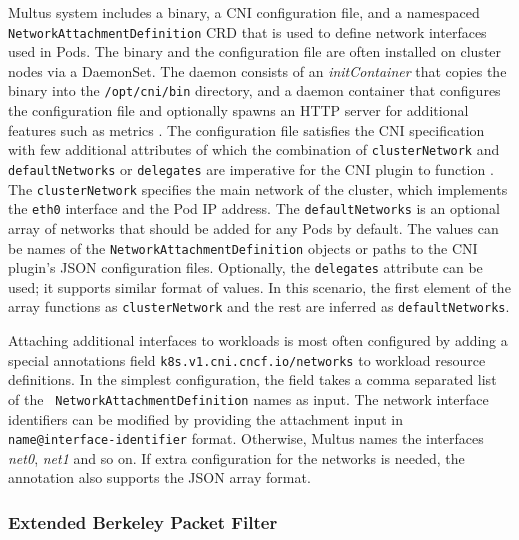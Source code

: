 \documentclass[english, 12pt, a4paper, sci, utf8, a-2b, online]{aaltothesis}
\begin{document}
Multus system includes a binary, a CNI configuration file, and a namespaced \texttt{NetworkAttachmentDefinition} CRD that is used to define network interfaces used in Pods.
The binary and the configuration file are often installed on cluster nodes via a DaemonSet.
The daemon consists of an \emph{initContainer} that copies the binary into the \texttt{/opt/cni/bin} directory, and a daemon container that configures the configuration file and optionally spawns an HTTP server for additional features such as metrics \cite{multus-cni}.
The configuration file satisfies the CNI specification with few additional attributes of which the combination of \texttt{clusterNetwork} and \texttt{defaultNetworks} or \texttt{delegates} are imperative for the CNI plugin to function \cite{multus-cni-config}.
The \texttt{clusterNetwork} specifies the main network of the cluster, which implements the \texttt{eth0} interface and the Pod IP address.
The \texttt{defaultNetworks} is an optional array of networks that should be added for any Pods by default.
The values can be names of the \texttt{NetworkAttachmentDefinition} objects or paths to the CNI plugin's JSON configuration files.
Optionally, the \texttt{delegates} attribute can be used; it supports similar format of values.
In this scenario, the first element of the array functions as \texttt{clusterNetwork} and the rest are inferred as \texttt{defaultNetworks}.


Attaching additional interfaces to workloads is most often configured by adding a special annotations field \texttt{k8s.v1.cni.cncf.io/networks} to workload resource definitions.
In the simplest configuration, the field takes a comma separated list of the \texttt{ NetworkAttachmentDefinition} names as input.
The network interface identifiers can be modified by providing the attachment input in \texttt{name@interface-identifier} format.
Otherwise, Multus names the interfaces \emph{net0}, \emph{net1} and so on.
If extra configuration for the networks is needed, the annotation also supports the JSON array format.

\subsubsection{Extended Berkeley Packet Filter}
\end{document}
